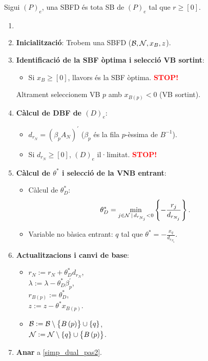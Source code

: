 \begin{defi}
    Sigui $\left(P\right)_e$, una SBFD és tota SB de $\left(P\right)_e$ tal que $r \geq \left[0\right]$.
\end{defi}
\begin{alg}
    \begin{enumerate}
        \item[]
        \item {\bf Inicialització}: Trobem una SBFD ($\mathcal{B}, \mathcal{N}, x_B, z$).
        \item \label{simp_dual_pas2} {\bf Identificació de la SBF òptima i selecció VB sortint}:
            \begin{itemize}
                \item Si $x_B \geq \left[0\right]$, llavors és la SBF òptima. \textcolor{red}{\bf STOP!}
            \end{itemize}
            Altrament seleccionem VB $p$ amb $x_{B\left(p\right)} < 0$ (VB sortint).
        \item {\bf Càlcul de DBF de $\left(D\right)_e$}:
            \begin{itemize}
                \item $d_{r_N} = \left(\beta_p A_N\right)^\prime$ ($\beta_p$ és la fila $p$-èssima de $B^{-1}$).
                \item Si $d_{r_N} \geq \left[0\right]$, $\left(D\right)_e$ il·limitat. \textcolor{red}{\bf STOP!}
            \end{itemize}
        \item {\bf Càlcul de $\theta^*$ i selecció de la VNB entrant}:
            \begin{itemize}
                \item Càlcul de $\theta_D^*$: 
                    \[\theta_D^* = \min_{j \in \mathcal{N} \,|\, d_{r_{N_j}} < 0} \left\{-\frac{r_j}{d_{r_{N_j}}} \right\}.\]
                \item Variable no bàsica entrant: $q$ tal que $\theta^* = -\frac{x_q}{d_{r_{N_q}}}$.
            \end{itemize}
        \item {\bf Actualitzacions i canvi de base}:
            \begin{itemize}
                \item $r_N := r_N + \theta_D^* d_{r_N}$, \\
                    $\lambda := \lambda - \theta_D^* \beta_p^\prime$, \\
                    $r_{B\left(p\right)} := \theta_D^*$, \\
                    $z := z - \theta^* x_{B\left(p\right)}$.
                \item $\mathcal{B} := \mathcal{B} \setminus \left\{B\left(p\right)\right\} \cup \left\{q\right\}$, \\
                    $\mathcal{N} := \mathcal{N} \setminus \left\{q\right\} \cup \left\{B\left(p\right)\right\}$.
            \end{itemize}
        \item {\bf Anar} a \ref{simp_dual_pas2}.
    \end{enumerate}
\end{alg}
